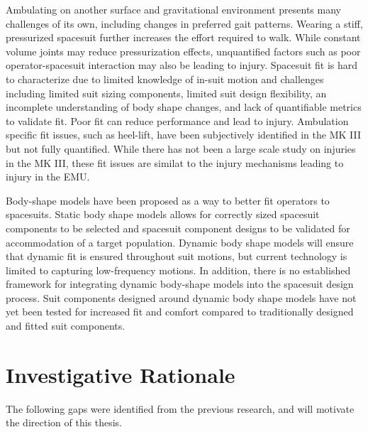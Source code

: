 \documentclass[defaultstyle,11pt]{comps}
\begin{document}
Ambulating on another surface and gravitational environment presents many challenges of its own, including changes in preferred gait patterns.
Wearing a stiff, pressurized spacesuit further increases the effort required to walk.
While constant volume joints may reduce pressurization effects, unquantified factors such as poor operator-spacesuit interaction may also be leading to injury.
Spacesuit fit is hard to characterize due to limited knowledge of in-suit motion and challenges including limited suit sizing components, limited suit design flexibility, an incomplete understanding of body shape changes, and lack of quantifiable metrics to validate fit.
Poor fit can reduce performance and lead to injury.
Ambulation specific fit issues, such as heel-lift, have been subjectively identified in the MK III but not fully quantified.
While there has not been a large scale study on injuries in the MK III, these fit issues are similat to the injury mechanisms leading to injury in the EMU.

Body-shape models have been proposed as a way to better fit operators to spacesuits.
Static body shape models allows for correctly sized spacesuit components to be selected and spacesuit component designs to be validated for accommodation of a target population.
Dynamic body shape models will ensure that dynamic fit is ensured throughout suit motions, but current technology is limited to capturing low-frequency motions.
In addition, there is no established framework for integrating dynamic body-shape models into the spacesuit design process.
Suit components designed around dynamic body shape models have not yet been tested for increased fit and comfort compared to traditionally designed and fitted suit components.

\hypertarget{investigative-rationale}{%
\chapter{Investigative Rationale}\label{investigative-rationale}}

The following gaps were identified from the previous research, and will motivate the direction of this thesis.
\end{document}
